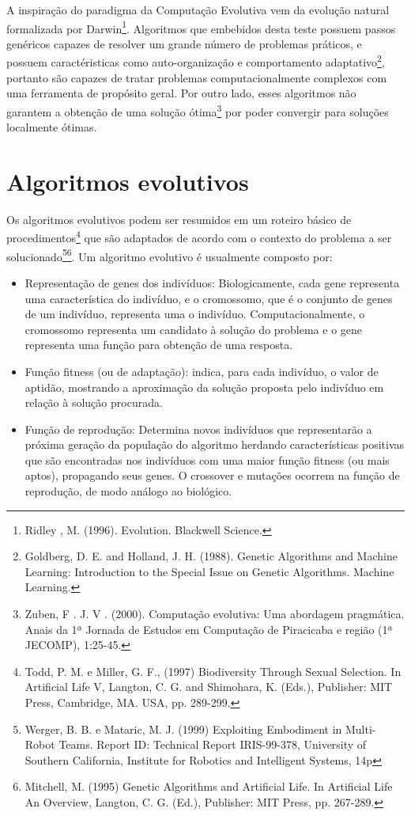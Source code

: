 A inspiração do paradigma da Computação Evolutiva vem da evolução natural formalizada por Darwin\footnote
{Ridley , M. (1996). Evolution. Blackwell Science.}.
Algoritmos que embebidos desta teste possuem passos genéricos capazes de resolver um grande número de problemas práticos, e possuem caractéristicas como auto-organização e comportamento adaptativo\footnote
{Goldberg, D. E. and Holland, J. H. (1988). Genetic Algorithms and Machine Learning: Introduction to the Special Issue on Genetic Algorithms. Machine Learning.},
portanto são capazes de tratar problemas computacionalmente complexos com uma ferramenta de propósito geral. Por outro lado, esses algoritmos não garantem a obtenção de uma solução ótima\footnote
{Zuben, F . J. V . (2000). Computação evolutiva: Uma abordagem pragmática. Anais da 1ª Jornada de Estudos em Computação de Piracicaba e região (1ª JECOMP), 1:25-45.}
por poder convergir para soluções localmente ótimas.

\section{Algoritmos evolutivos}
Os algoritmos evolutivos podem ser resumidos em um roteiro básico de procedimentos\footnote
{Todd, P. M. e Miller, G. F., (1997) Biodiversity Through Sexual Selection. In Artificial Life V, Langton, C. G. and Shimohara, K. (Eds.), Publisher: MIT Press, Cambridge, MA. USA, pp. 289-299.}
que são adaptados de acordo com o contexto do problema a ser solucionado\footnote
{Werger, B. B. e Mataric, M. J. (1999) Exploiting Embodiment in Multi-Robot Teams. Report ID: Technical Report IRIS-99-378, University of Southern California, Institute for Robotics and Intelligent Systems, 14p}\footnote
{Mitchell, M. (1995) Genetic Algorithms and Artificial Life. In Artificial Life An Overview, Langton, C. G. (Ed.), Publisher: MIT Press, pp. 267-289.}.
Um algoritmo evolutivo é usualmente composto por:

\begin{itemize}
    \item Representação de genes dos indivíduos: Biologicamente, cada gene representa uma característica do indivíduo, e o cromossomo, que é o conjunto de genes de um indivíduo, representa uma o indivíduo. Computacionalmente, o cromossomo representa um candidato à solução do problema e o gene representa uma função para obtenção de uma resposta.
    \item Função fitness (ou de adaptação): indica, para cada indivíduo, o valor de aptidão, mostrando a aproximação da solução proposta pelo indivíduo em relação à solução procurada.
    \item Função de reprodução: Determina novos indivíduos que representarão a próxima geração da população do algoritmo herdando características positivas que são encontradas nos indivíduos com uma maior função fitness (ou mais aptos), propagando seus genes. O crossover e mutações ocorrem na função de reprodução, de modo análogo ao biológico.
\end{itemize}